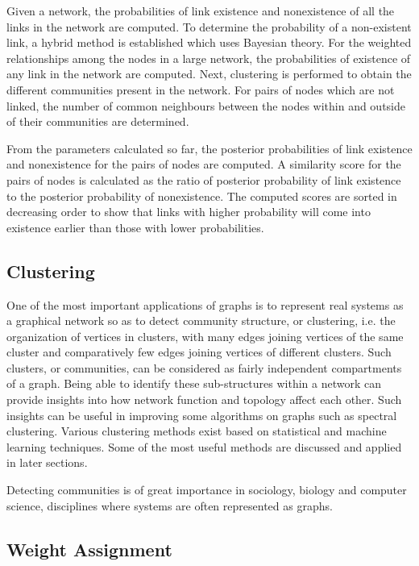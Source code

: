 Given a network, the probabilities of link existence and nonexistence of all the links in the network are computed. To determine the probability of a non-existent link, a hybrid method is established which uses Bayesian theory. For the weighted relationships among the nodes in a large network, the probabilities of existence of any link in the network are computed. Next, clustering is performed to obtain the different communities present in the network. For pairs of nodes which are not linked, the number of common neighbours between the nodes within and outside of their communities are determined.

From the parameters calculated so far, the posterior probabilities of link existence and nonexistence for the pairs of nodes are computed. A similarity score for the pairs of nodes is calculated as the ratio of posterior probability of link existence to the posterior probability of nonexistence. The computed scores are sorted in decreasing order to show that links with higher probability will come into existence earlier than those with lower probabilities.

\subsection{Clustering}

One of the most important applications of graphs is to represent real systems as a graphical network so as to detect community structure, or clustering, i.e. the organization of vertices in clusters, with many edges joining vertices of the same cluster and comparatively few edges joining vertices of different clusters. Such clusters, or communities, can be considered as fairly independent compartments of a graph. Being able to identify these sub-structures within a network can provide insights into how network function and topology affect each other. Such insights can be useful in improving some algorithms on graphs such as spectral clustering. Various clustering methods exist based on statistical
and machine learning techniques. Some of the most useful methods are discussed and applied in later
sections.

Detecting communities is of great importance in sociology, biology and computer science, disciplines where systems are often represented as graphs.


\subsection{Weight Assignment}

